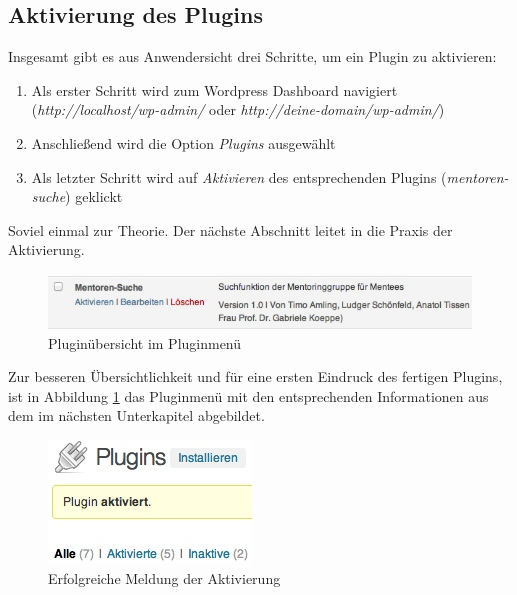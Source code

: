 \subsection{Aktivierung des Plugins}\label{aktivierungplugin}
Insgesamt gibt es aus Anwendersicht drei Schritte, um ein Plugin zu aktivieren:
\begin{enumerate}
	\item Als erster Schritt wird zum Wordpress Dashboard navigiert ({\emph{http://localhost/wp-admin/} oder \emph{http://deine-domain/wp-admin/}})
	\item Anschließend wird die Option {\emph{Plugins}} ausgewählt
	\item Als letzter Schritt wird auf {\emph{Aktivieren}}	des entsprechenden Plugins ({\emph{mentoren-suche}}) geklickt
\end{enumerate}
Soviel einmal zur Theorie. Der nächste Abschnitt leitet in die Praxis der Aktivierung.
   \begin{figure}[htbp]
	\begin{center}
		\includegraphics[angle={360}, scale=0.61]{pictures/plugin_deak.jpg}
	    \caption{Pluginübersicht im Pluginmenü}
	    \label{img:ERFMELDPM}
	    	\end{center}
   \end{figure} 
Zur besseren Übersichtlichkeit und für eine ersten Eindruck des fertigen Plugins, ist in Abbildung 
\ref{img:ERFMELDPM} das Pluginmenü mit den entsprechenden Informationen aus dem im nächsten Unterkapitel  abgebildet.
   \begin{figure}[htbp]
	\begin{center}
	\includegraphics[angle={360}, scale=0.61]{pictures/plugin_akt.jpg}
	    \caption{Erfolgreiche Meldung der Aktivierung}
	    \label{img:ERFMELDAK}
	\end{center}
   \end{figure}\newline
